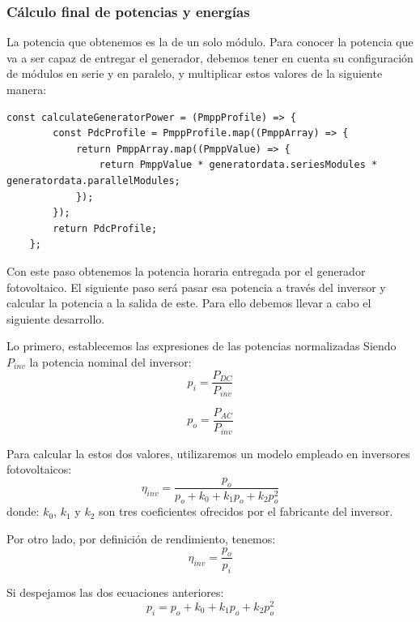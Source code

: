 \subsubsection{Cálculo final de potencias y energías}

La potencia que obtenemos es la de un solo módulo. Para conocer la potencia que va a ser capaz de entregar el generador, debemos tener en cuenta su configuración de módulos en serie y en paralelo, y multiplicar estos valores de la siguiente manera:

\begin{lstlisting}[style=ES6, caption={Cálculo de la potencia del generador}]
	const calculateGeneratorPower = (PmppProfile) => {
		const PdcProfile = PmppProfile.map((PmppArray) => {
			return PmppArray.map((PmppValue) => {
				return PmppValue * generatordata.seriesModules * generatordata.parallelModules;
			});
		});
		return PdcProfile;
	};

\end{lstlisting}

Con este paso obtenemos la potencia horaria entregada por el generador fotovoltaico. El siguiente paso será pasar esa potencia a través del inversor y calcular la potencia a la salida de este. Para ello debemos llevar a cabo el siguiente desarrollo.

Lo primero, establecemos las expresiones de las potencias normalizadas Siendo $P_{inv}$ la potencia nominal del inversor:
\begin{equation}
\label{eqn:p_i}
p_i = \frac{P_{DC}}{P_{inv}}
\end{equation}

\begin{equation}
\label{eqn:p_o}
p_o = \frac{P_{AC}}{P_{inv}}
\end{equation}

Para calcular la estos dos valores, utilizaremos un modelo empleado en inversores fotovoltaicos:
\begin{equation}
\eta_{inv} = \frac{p_o}{p_o + k_0 + k_1 p_o + k_2 p_o^2}
\end{equation}
donde: $k_0$, $k_1$ y $k_2$ son tres coeficientes ofrecidos por el fabricante del inversor.

Por otro lado, por definición de rendimiento, tenemos:
\begin{equation}
\eta_{inv} = \frac{p_o}{p_i}
\end{equation}

Si despejamos las dos ecuaciones anteriores:
\begin{equation}
p_i = p_o + k_0 + k_1p_o + k_2p_o^2
\end{equation}

